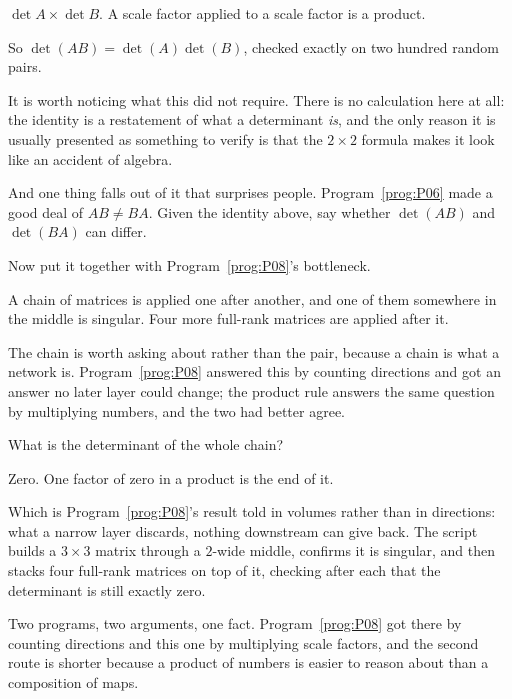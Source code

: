 \begin{fr}
\begin{ansblock}
$\det A \times \det B$. A scale factor applied to a scale factor is a product.
\end{ansblock}

So $\det(AB) = \det(A)\det(B)$, checked exactly on two hundred random pairs.

It is worth noticing what this did not require. There is no calculation here at
all: the identity is a restatement of what a determinant \emph{is}, and the
only reason it is usually presented as something to verify is that the
$2 \times 2$ formula makes it look like an accident of algebra.

And one thing falls out of it that surprises people.
Program~\ref{prog:P06} made a good deal of $AB \ne BA$. Given the identity
above, say whether $\det(AB)$ and $\det(BA)$ can differ.
\dotline
\nextframe
\end{fr}

\begin{fr}
Now put it together with Program~\ref{prog:P08}'s bottleneck.

A chain of matrices is applied one after another, and one of them somewhere in
the middle is singular. Four more full-rank matrices are applied after it.

The chain is worth asking about rather than the pair, because a chain is what
a network is. Program~\ref{prog:P08} answered this by counting directions and
got an answer no later layer could change; the product rule answers the same
question by multiplying numbers, and the two had better agree.

What is the determinant of the whole chain?
\dotline
\nextframe
\end{fr}

\begin{fr}
\begin{ansblock}
Zero. One factor of zero in a product is the end of it.
\end{ansblock}

Which is Program~\ref{prog:P08}'s result told in volumes rather than in
directions: what a narrow layer discards, nothing downstream can give back. The
script builds a $3 \times 3$ matrix through a $2$-wide middle, confirms it is
singular, and then stacks four full-rank matrices on top of it, checking after
each that the determinant is still exactly zero.

Two programs, two arguments, one fact. Program~\ref{prog:P08} got there by
counting directions and this one by multiplying scale factors, and the second
route is shorter because a product of numbers is easier to reason about than a
composition of maps.
\end{fr}

